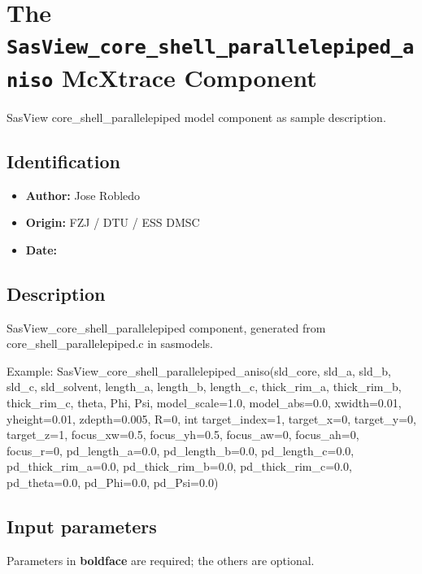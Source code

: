 \section{The \texttt{SasView\_core\_shell\_parallelepiped\_aniso} McXtrace Component}
SasView core\_shell\_parallelepiped model component as sample description.

\subsection*{Identification}
\begin{itemize}
  \item \textbf{Author:} Jose Robledo
  \item \textbf{Origin:} FZJ / DTU / ESS DMSC
  \item \textbf{Date:} 
\end{itemize}

\subsection*{Description}
SasView\_core\_shell\_parallelepiped component, generated from core\_shell\_parallelepiped.c in sasmodels.

Example: SasView\_core\_shell\_parallelepiped\_aniso(sld\_core, sld\_a, sld\_b, sld\_c, sld\_solvent, length\_a, length\_b, length\_c, thick\_rim\_a, thick\_rim\_b, thick\_rim\_c, theta, Phi, Psi, model\_scale=1.0, model\_abs=0.0, xwidth=0.01, yheight=0.01, zdepth=0.005, R=0, int target\_index=1, target\_x=0, target\_y=0, target\_z=1, focus\_xw=0.5, focus\_yh=0.5, focus\_aw=0, focus\_ah=0, focus\_r=0, pd\_length\_a=0.0, pd\_length\_b=0.0, pd\_length\_c=0.0, pd\_thick\_rim\_a=0.0, pd\_thick\_rim\_b=0.0, pd\_thick\_rim\_c=0.0, pd\_theta=0.0, pd\_Phi=0.0, pd\_Psi=0.0)

\subsection*{Input parameters}
Parameters in \textbf{boldface} are required; the others are optional.

